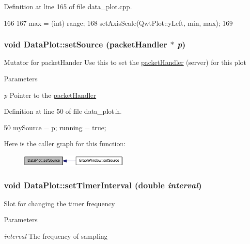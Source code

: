Definition at line 165 of file data\_\-plot.cpp.




\begin{DoxyCode}
166 {
167     max = (int) range;
168     setAxisScale(QwtPlot::yLeft, min, max);
169 }
\end{DoxyCode}


\hypertarget{classDataPlot_aace03b9e68e11042c0fade588e2869a7}{
\subsubsection[{setSource}]{\setlength{\rightskip}{0pt plus 5cm}void DataPlot::setSource ({\bf packetHandler} $\ast$ {\em p})}}
\label{classDataPlot_aace03b9e68e11042c0fade588e2869a7}
Mutator for packetHander Use this to set the \hyperlink{classpacketHandler}{packetHandler} (server) for this plot 
\begin{DoxyParams}{Parameters}
\item[{\em p}]Pointer to the \hyperlink{classpacketHandler}{packetHandler} \end{DoxyParams}


Definition at line 50 of file data\_\-plot.h.




\begin{DoxyCode}
50 { mySource = p; running = true; }
\end{DoxyCode}




Here is the caller graph for this function:\nopagebreak
\begin{figure}[H]
\begin{center}
\leavevmode
\includegraphics[width=155pt]{classDataPlot_aace03b9e68e11042c0fade588e2869a7_icgraph}
\end{center}
\end{figure}


\hypertarget{classDataPlot_a926020e0c49d78d3d5d282848368651e}{
\subsubsection[{setTimerInterval}]{\setlength{\rightskip}{0pt plus 5cm}void DataPlot::setTimerInterval (double {\em interval})}}
\label{classDataPlot_a926020e0c49d78d3d5d282848368651e}
Slot for changing the timer frequency 
\begin{DoxyParams}{Parameters}
\item[{\em interval}]The frequency of sampling \end{DoxyParams}


